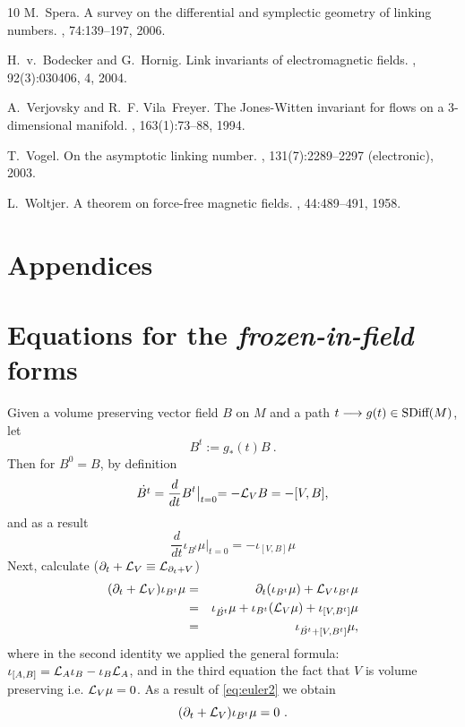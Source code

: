\documentclass[12pt]{article}
\numberwithin{equation}{section}
\newcommand{\Lie}{{\cal L}}
\begin{document}
\begin{thebibliography}{10}
M.~Spera.
\newblock A survey on the differential and symplectic geometry of linking
  numbers.
, 74:139--197, 2006.

H.~v.~Bodecker and G.~Hornig.
\newblock Link invariants of electromagnetic fields.
, 92(3):030406, 4, 2004.

A.~Verjovsky and R.~F. Vila~Freyer.
\newblock The {J}ones-{W}itten invariant for flows on a {$3$}-dimensional
  manifold.
, 163(1):73--88, 1994.

T.~Vogel.
\newblock On the asymptotic linking number.
, 131(7):2289--2297 (electronic), 2003.

L.~Woltjer.
\newblock A theorem on force-free magnetic fields.
, 44:489--491, 1958.

\end{thebibliography}


\section*{Appendices}

\appendix


\section{Equations for the \emph{frozen-in-field} forms}\label{apx:A}
Given a volume preserving vector field $B$ on $M$ and a path $t\longrightarrow g(t)\in \text{\rm SDiff}(M)$, let 
\[
 B^t:=g_\ast(t)B\ . 
\]
Then for $B^0=B$, by definition 
\begin{equation}\label{eq:euler2}
 \dot{B^t}=\frac{d}{dt} B^t\bigl|_{t=0}=-\Lie_V B=-[V,B],
\end{equation}
and as a result 
\[
  \frac{d}{dt} \iota_{B^t}\mu|_{t=0}  =  -\iota_{[V,B]} \mu  
\]
Next, calculate ($\partial_t+\Lie_V\equiv \Lie_{\partial_t+V}$)
\begin{eqnarray*}
 (\partial_t+\Lie_V)\iota_{B^t}\mu & = & \partial_t(\iota_{B^t}\mu)+\Lie_V\iota_{B^t}\mu\\
 & = & \iota_{\dot{B^t}}\mu+\iota_{B^t}(\Lie_V\mu)+\iota_{[V,B^t]}\mu\\
 & = & \iota_{\dot{B^t}+[V,B^t]}\mu,
\end{eqnarray*}
where in the second identity we applied the general formula: $\iota_{[A,B]}=\Lie_A\iota_B-\iota_B\Lie_A$, and in the third equation the fact that $V$ is volume preserving i.e. $\Lie_V\mu=0$. As a result 
of \eqref{eq:euler2} we obtain
\[
 (\partial_t+\Lie_V)\iota_{B^t}\mu=0\ .
\]
\end{document}

